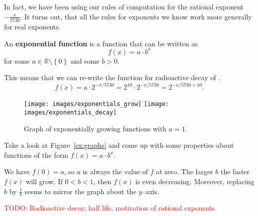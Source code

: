 In fact, we have been using our rules of computation for the rational exponent $-\frac{x}{5730}$.
It turns out, that all the rules for exponents we know work more generally for real exponents.
\begin{tcolorbox}
	An \textbf{exponential function} is a function that can be written as
	\begin{equation*}
		f\left(x\right)=a\cdot b^x
	\end{equation*}
	for some $a\in\mathbb R\setminus\left\{0\right\}$ and some $b>0$.
\end{tcolorbox}
This means that we can re-write the function for radioactive decay of .
\begin{equation*}
	f\left(x\right)=a\cdot 2^{-x/5730}=2^{10}\cdot 2^{-x/5730}=2^{-x/5730+10}.
\end{equation*}
\begin{figure}[ht]
	\centering
	\texttt{[image: images/exponentials\_grow]}\hfill
	\texttt{[image: images/exponentials\_decay]}
	\caption{Graph of exponentially growing functions with $a=1$.}
	\label{fig:graphs}
\end{figure}
\begin{exercise} \label{ex:graphs}
	Take a look at Figure~\ref{ex:graphs} and come up with some properties about functions of the form $f\left(x\right)=a\cdot b^x$.
\end{exercise}
\begin{solution*}
	We have $f\left(0\right)=a$, so $a$ is always the value of $f$ at zero.
	The larger $b$ the faster $f\left(x\right)$ will grow.
	If $0<b<1$, then $f\left(x\right)$ is even decreasing.
	Moreover, replacing $b$ by $\frac{1}{b}$ seems to mirror the graph about the $y$--axis.
\end{solution*}
\textcolor{red}{TODO: Radioactive decay, half life, motivation of rational exponents}